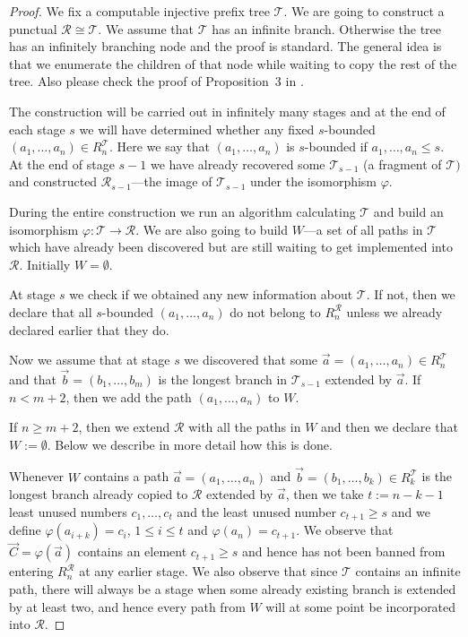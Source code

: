 \documentclass[a4paper,UKenglish,cleveref, autoref, thm-restate]{lipics-v2021}
\begin{document}
\begin{proof}
    We fix a computable injective prefix tree $\mathcal{T}$. We are going to construct a punctual $\mathcal{R} \cong \mathcal{T}$. We assume that $\mathcal{T}$ has an infinite branch. Otherwise the tree has an infinitely branching node and the proof is standard.
    The general idea is that we enumerate the children of that node while waiting to copy the rest of the tree. Also please check the proof of Proposition~3 in \cite{kalocinski_punctual_2024}.



    The construction will be carried out in infinitely many stages and at the end of each stage $s$ we will have determined whether any fixed $s$-bounded $(a_1,\dots,a_n) \in R_n^{\mathcal{T}}$. Here we say that $(a_1,\dots,a_n)$ is $s$-bounded if $a_1,\dots,a_n \leq s$. At the end of stage $s-1$ we have already recovered some $\mathcal{T}_{s-1}$ (a fragment of $\mathcal{T})$ and constructed $\mathcal{R}_{s-1}$---the image of $\mathcal{T}_{s-1}$ under the isomorphism $\varphi$.

   During the entire construction we run an algorithm calculating $\mathcal{T}$ and build an isomorphism $\varphi: \mathcal{T} \to \mathcal{R}$. We are also going to build $W$---a set of all paths in $\mathcal{T}$ which have already been discovered but are still waiting to get implemented into $\mathcal{R}$. Initially $W=\emptyset$.
   
   At stage $s$ we check if we obtained any new information about $\mathcal{T}$. If not, then we declare that all $s$-bounded $(a_1,\dots,a_n)$ do not belong to $R_n^{\mathcal{R}}$ unless we already declared earlier that they do.

   Now we assume that at stage $s$ we discovered that some $\vec{a}=(a_1,\dots,a_n) \in R_n^{\mathcal{T}}$ and that $\vec{b}=(b_1,\dots,b_m)$ is the longest branch in $\mathcal{T}_{s-1}$ extended by $\vec{a}$. If $n < m+2$, then we add the path $(a_1,\dots,a_n)$ to $W$.

   If $n \geq m+2$, then we extend $\mathcal{R}$ with all the paths in $W$ and then we declare that $W:=\emptyset$. Below we describe in more detail how this is done.

   Whenever $W$ contains a path $\vec{a}=(a_1,\dots,a_n)$ and $\vec{b}=(b_1,\dots,b_k) \in R_k^{\mathcal{T}}$ is the longest branch already copied to $\mathcal{R}$ extended by $\vec{a}$, then we take $t:=n-k-1$ least unused numbers $c_1,\dots,c_t$ and the least unused number $c_{t+1} \geq s$ and we define $\varphi(a_{i+k})=c_i$, $1 \leq i \leq t$ and $\varphi(a_n)=c_{t+1}$. We observe that $\vec{C}=\varphi(\vec{a})$ contains an element $c_{t+1} \geq s$ and hence has not been banned from entering $R_n^{\mathcal{R}}$ at any earlier stage. We also observe that since $\mathcal{T}$ contains an infinite path, there will always be a stage when some already existing branch is extended by at least two, and hence every path from $W$ will at some point be incorporated into $\mathcal{R}$.
\end{proof}
\end{document}
